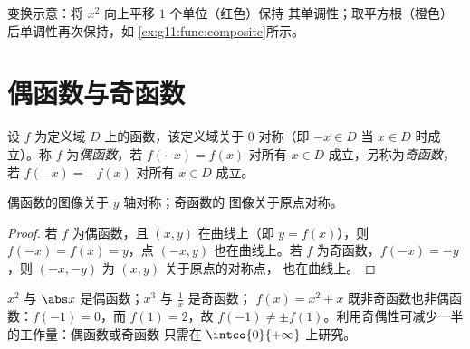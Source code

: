 \begin{omfigure}

{\small 变换示意：将 $x^2$ 向上平移 $1$ 个单位（红色）保持
其单调性；取平方根（橙色）后单调性再次保持，如
\cref{ex:g11:func:composite}所示。}
\end{omfigure}

\section{偶函数与奇函数}

\begin{definition}[奇偶性]\label{def:g11:func:parity}
设 $f$ 为定义域 $D$ 上的函数，该定义域关于 $0$ 对称（即 $-x \in D$
当 $x \in D$ 时成立）。称 $f$ 为\emph{偶函数}，若
$f(-x) = f(x)$ 对所有 $x \in D$ 成立，另称为\emph{奇函数}，若
$f(-x) = -f(x)$ 对所有 $x \in D$ 成立。
\end{definition}

\begin{proposition}[几何意义]\label{prop:g11:func:paritysym}
偶函数的图像关于 $y$ 轴对称；奇函数的
图像关于原点对称。
\end{proposition}

\begin{proof}
若 $f$ 为偶函数，且 $(x, y)$ 在曲线上（即 $y = f(x)$），则
$f(-x) = f(x) = y$，点 $(-x, y)$ 也在曲线上。若
$f$ 为奇函数，$f(-x) = -y$，则 $(-x, -y)$ 为 $(x,y)$ 关于原点的对称点，
也在曲线上。
\end{proof}

\begin{example}
$x^2$ 与 $\abs x$ 是偶函数；$x^3$ 与 $\frac1x$ 是奇函数；
$f(x) = x^2 + x$ 既非奇函数也非偶函数：$f(-1) = 0$，而 $f(1) = 2$，故
$f(-1) \neq \pm f(1)$。利用奇偶性可减少一半的工作量：偶函数或奇函数
只需在 $\intco{0}{+\infty}$ 上研究。
\end{example}


